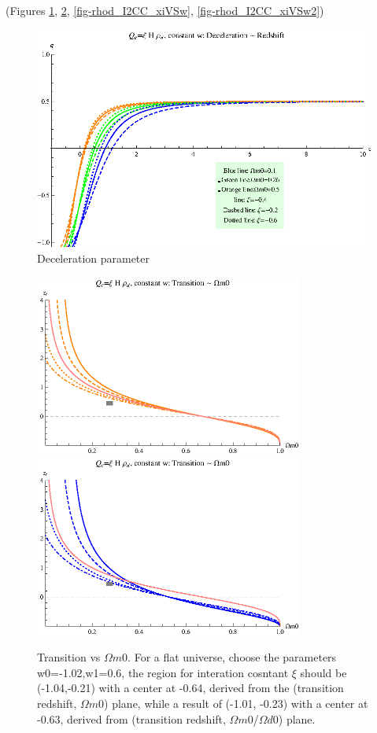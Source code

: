 \documentclass[12pt,a4paper]{article}
\begin{document}
(Figures \ref{fig-rhod_I2CC_DecPara}, \ref{fig-rhod_I2CC_TransVSOmegam0}, \ref{fig-rhod_I2CC_xiVSw}, \ref{fig-rhod_I2CC_xiVSw2})

\begin{figure}
\centering
\includegraphics[width=500pt]{rhod_I2CC_DecPara.eps}
\caption{Deceleration parameter}\label{fig-rhod_I2CC_DecPara}
\end{figure}

\begin{figure}
\centering
\includegraphics[width=250pt]{rhod_I2CC_TransVSOmegam01.eps}
\includegraphics[width=250pt]{rhod_I2CC_TransVSOmegam02.eps}
\caption{Transition vs $\Omega m0$. For a flat universe, choose the parameters {w0=-1.02,w1=0.6}, the region for interation cosntant $\xi$ should be  (-1.04,-0.21) with a center at -0.64, derived from the (transition redshift, $\Omega m0$) plane, while a result of (-1.01, -0.23) with a center at -0.63, derived from (transition redshift, $\Omega m0$/$\Omega d0$) plane.}\label{fig-rhod_I2CC_TransVSOmegam0}
\end{figure}
\end{document}
